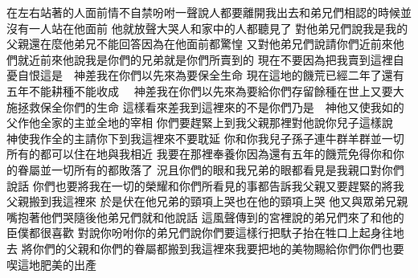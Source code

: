 \bchapter%
在左右站著的人面前\chientien 情不自禁\chientien 吩咐一聲說\chientien 人都要離開我出去\yuentien{}和弟兄們相認的時候\chientien 並沒有一人站在他面前\chuan 
{}他就放聲大哭\chientien{}人\chientien 和家中的人都聽見了\chuan 
{}對他弟兄們說\chientien 我是\chientien 我的父親還在麼\yuentien 他弟兄不能回答\chientien 因為在他面前都驚惶\chuan 
{}又對他弟兄們說\chientien 請你們近前來\chientien 他們就近前來\yuentien 他說\chientien 我是你們的兄弟\chientien 就是你們所賣到的\chuan 
{}現在不要因為把我賣到這裡\chientien 自憂自恨\chientien 這是　神差我在你們以先來\chientien 為要保全生命\chuan 
{}現在這地的饑荒已經二年了\chientien 還有五年不能耕種\chientien 不能收成\chuan 
{}　神差我在你們以先來\chientien 為要給你們存留餘種在世上\chientien 又要大施拯救\chientien 保全你們的生命\chuan 
{}這樣看來\chientien 差我到這裡來的不是你們\chientien 乃是　神\chientien 他又使我如的父\chientien 作他全家的主\chientien 並全地的宰相\chuan 
{}你們要趕緊上到我父親那裡\chientien 對他說\chientien 你兒子這樣說\chientien 　神使我作全的主\chientien 請你下到我這裡來\chientien 不要耽延\chuan 
{}你和你我兒子\chientien 孫子\chientien 連牛群\chientien 羊群\chientien 並一切所有的\chientien 都可以住在地\chientien 與我相近\yuentien 
{}我要在那裡奉養你\yuentien 因為還有五年的饑荒\chientien 免得你和你的眷屬\chientien 並一切所有的\chientien 都敗落了\chuan 
{}況且你們的眼和我兄弟的眼\chientien 都看見是我親口對你們說話\chuan 
{}你們也要將我在一切的榮耀\chientien 和你們所看見的事\chientien 都告訴我父親\chientien 又要趕緊的將我父親搬到我這裡來\chuan 
{}於是伏在他兄弟的頸項上哭\chientien{}也在他的頸項上哭\chuan 
{}他又與眾弟兄親嘴\chientien 抱著他們哭\chientien 隨後他弟兄們就和他說話\chuan\Chuan
{}這風聲傳到的宮裡\chientien 說\chientien{}的弟兄們來了\yuentien{}和他的臣僕都很喜歡\chuan 
{}對說\chientien 你吩咐你的弟兄們說\chientien 你們要這樣行\chientien 把馱子抬在牲口上\chientien 起身往地去\chuan 
{}將你們的父親和你們的眷屬\chientien 都搬到我這裡來\chientien 我要把地的美物賜給你們\chientien 你們也要喫這地肥美的出產\chuan 
